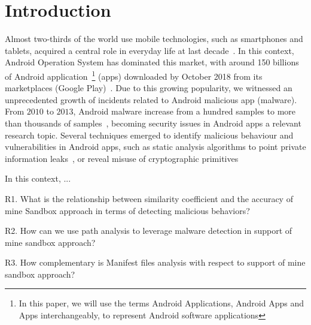 \section{Introduction}\label{sec:introduction}

Almost two-thirds of the world use mobile technologies, such as smartphones and tablets, acquired a central role in everyday life at last decade~\cite{Comscore}\cite{DBLP:journals/tse/MartinSJZH17}. In this context, Android Operation System has dominated this market, with around 150 billions of Android application~\footnote{In this paper, we will use the terms Android Applications, Android Apps and Apps interchangeably, to represent Android software applications} (apps) downloaded by October 2018 from its marketplaces (Google Play)~\cite{Statista}. Due to this growing popularity, we witnessed an unprecedented growth of incidents related to Android malicious app (malware). From $2010$ to $2013$, Android malware increase from a hundred samples to more than thousands of samples~\cite{DBLP:journals/comsur/FarukiBLGGCR15,DBLP:journals/csur/SufatrioTCT15}, becoming security issues in Android apps a relevant research topic. Several techniques emerged to identify malicious behaviour and vulnerabilities in Android apps, such as static analysis algorithms to point private information leaks~\cite{DBLP:conf/pldi/ArztRFBBKTOM14}, or reveal misuse of 
cryptographic primitives~\cite{DBLP:journals/tse/KrugerSABM21}

In this context, ...

R1. What is the relationship between similarity coefficient and the accuracy of mine Sandbox approach in terms of detecting malicious behaviors?

R2. How can we use path analysis to leverage malware detection in support of mine sandbox approach?

R3. How complementary is Manifest files analysis with respect to support of mine sandbox approach?